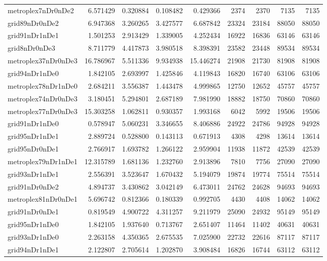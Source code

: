 \begin{longtable}{|l|r|r|r|r|r|r|r|r|}
metroplex7nDr0nDe2 & 6.571429 & 0.320884 & 0.108482 & 0.429366 & 2374 & 2370 & 7135 & 7135 \\
grid89nDr0nDe2 & 6.947368 & 3.260265 & 3.427577 & 6.687842 & 23324 & 23184 & 88050 & 88050 \\
grid91nDr1nDe1 & 1.501253 & 2.913429 & 1.339005 & 4.252434 & 16922 & 16836 & 63146 & 63146 \\
grid8nDr0nDe3 & 8.711779 & 4.417873 & 3.980518 & 8.398391 & 23582 & 23448 & 89534 & 89534 \\
metroplex37nDr0nDe3 & 16.786967 & 5.511336 & 9.934938 & 15.446274 & 21908 & 21730 & 81908 & 81908 \\
grid94nDr1nDe0 & 1.842105 & 2.693997 & 1.425846 & 4.119843 & 16820 & 16740 & 63106 & 63106 \\
metroplex78nDr1nDe0 & 2.684211 & 3.556387 & 1.443478 & 4.999865 & 12750 & 12652 & 45757 & 45757 \\
metroplex74nDr0nDe3 & 3.180451 & 5.294801 & 2.687189 & 7.981990 & 18882 & 18750 & 70860 & 70860 \\
metroplex77nDr0nDe3 & 15.303258 & 1.062811 & 0.930357 & 1.993168 & 6042 & 5992 & 19506 & 19506 \\
grid91nDr1nDe0 & 0.578947 & 5.060231 & 3.346655 & 8.406886 & 24922 & 24786 & 94928 & 94928 \\
grid95nDr1nDe1 & 2.889724 & 0.528800 & 0.143113 & 0.671913 & 4308 & 4298 & 13614 & 13614 \\
grid95nDr0nDe1 & 2.766917 & 1.693782 & 1.266122 & 2.959904 & 11938 & 11872 & 42539 & 42539 \\
metroplex79nDr1nDe1 & 12.315789 & 1.681136 & 1.232760 & 2.913896 & 7810 & 7756 & 27090 & 27090 \\
grid93nDr1nDe1 & 2.556391 & 3.523647 & 1.670432 & 5.194079 & 19874 & 19774 & 75514 & 75514 \\
grid91nDr0nDe2 & 4.894737 & 3.430862 & 3.042149 & 6.473011 & 24762 & 24628 & 94693 & 94693 \\
metroplex81nDr0nDe1 & 5.696742 & 0.812366 & 0.180339 & 0.992705 & 4430 & 4408 & 14062 & 14062 \\
grid91nDr0nDe1 & 0.819549 & 4.900722 & 4.311257 & 9.211979 & 25090 & 24932 & 95149 & 95149 \\
grid95nDr1nDe0 & 1.842105 & 1.937640 & 0.713767 & 2.651407 & 11464 & 11402 & 40631 & 40631 \\
grid93nDr1nDe0 & 2.263158 & 4.350365 & 2.675535 & 7.025900 & 22732 & 22616 & 87117 & 87117 \\
grid94nDr1nDe1 & 2.122807 & 2.705614 & 1.202870 & 3.908484 & 16826 & 16744 & 63112 & 63112 \\

\end{longtable}
